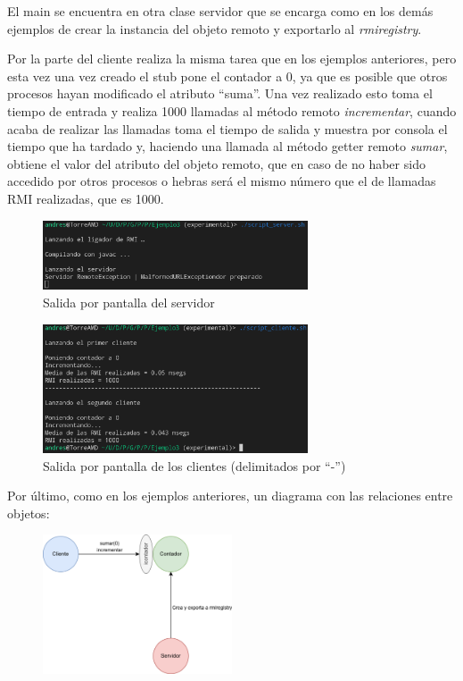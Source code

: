 \documentclass{article}
\begin{document}
El main se encuentra en otra clase servidor que se encarga como en los demás ejemplos de crear la instancia del objeto remoto y exportarlo al \textit{rmiregistry}.

\bigskip

Por la parte del cliente realiza la misma tarea que en los ejemplos anteriores, pero esta vez una vez creado el stub pone el contador a 0, ya que es posible que otros procesos hayan modificado el atributo ``suma''. Una vez realizado esto toma el tiempo de entrada y realiza 1000 llamadas al método remoto \textit{incrementar}, cuando acaba de realizar las llamadas toma el tiempo de salida y muestra por consola el tiempo que ha tardado y, haciendo una llamada al método getter remoto \textit{sumar}, obtiene el valor del atributo del objeto remoto, que en caso de no haber sido accedido por otros procesos o hebras será el mismo número que el de llamadas RMI realizadas, que es 1000.


\begin{figure}[H]
    \centering
    \includegraphics[width=0.7\textwidth]{imagenes/E3S1.png}
    \caption{Salida por pantalla del servidor}
\end{figure}

\begin{figure}[H]
    \centering
    \includegraphics[width=0.7\textwidth]{imagenes/E3C1.png}
    \caption{Salida por pantalla de los clientes (delimitados por ``-'')}
\end{figure}

Por último, como en los ejemplos anteriores, un diagrama con las relaciones entre objetos:

\begin{figure}[H]
    \centering
    \includegraphics[width=0.5\textwidth]{imagenes/E3Diagrama.png}
\end{figure}
\end{document}

